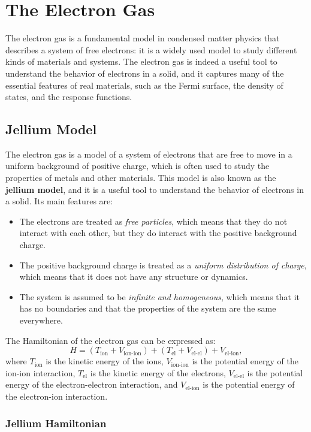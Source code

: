 \chapter{The Electron Gas}

The electron gas is a fundamental model in condensed matter physics that describes a system of free electrons: it is a widely used model to study different kinds of materials and systems. The electron gas is indeed a useful tool to understand the behavior of electrons in a solid, and it captures many of the essential features of real materials, such as the Fermi surface, the density of states, and the response functions.

\section{Jellium Model}

The electron gas is a model of a system of electrons that are free to move in a uniform background of positive charge, which is often used to study the properties of metals and other materials. This model is also known as the \textbf{jellium model}, and it is a useful tool to understand the behavior of electrons in a solid. Its main features are:
\begin{itemize}
    \item The electrons are treated as \textit{free particles}, which means that they do not interact with each other, but they do interact with the positive background charge.
    \item The positive background charge is treated as a \textit{uniform distribution of charge}, which means that it does not have any structure or dynamics.
    \item The system is assumed to be \textit{infinite and homogeneous}, which means that it has no boundaries and that the properties of the system are the same everywhere.
\end{itemize}
The Hamiltonian of the electron gas can be expressed as:
\[
    H = (T_{\text{ion}} + V_{\text{ion-ion}}) + (T_{\text{el}} + V_{\text{el-el}}) + V_{\text{el-ion}},
\]
where \(T_{\text{ion}}\) is the kinetic energy of the ions, \(V_{\text{ion-ion}}\) is the potential energy of the ion-ion interaction, \(T_{\text{el}}\) is the kinetic energy of the electrons, \(V_{\text{el-el}}\) is the potential energy of the electron-electron interaction, and \(V_{\text{el-ion}}\) is the potential energy of the electron-ion interaction.

\subsection{Jellium Hamiltonian}

